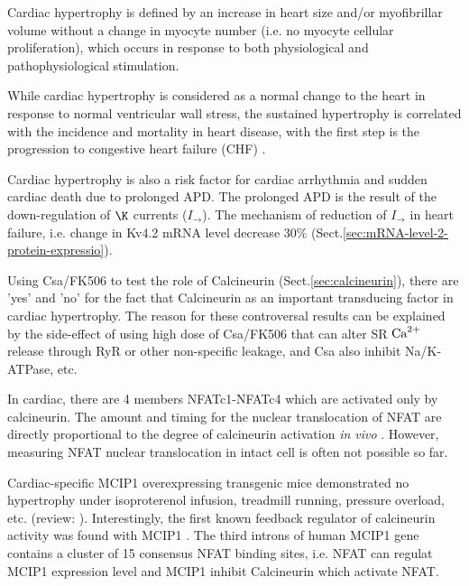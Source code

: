 \begin{framed}
Cardiac hypertrophy is defined by an increase in heart size and/or myofibrillar
volume without a change in myocyte number (i.e. no myocyte cellular
proliferation), which occurs in response to both physiological and
pathophysiological stimulation. 

While cardiac hypertrophy is considered as a normal change to the heart in
response to normal ventricular wall stress, the sustained hypertrophy is
correlated with the incidence and mortality in heart disease, with the first
step is the progression to congestive heart failure (CHF) \citep{levy1990}. 

Cardiac hypertrophy is also a risk factor for cardiac arrhythmia and sudden
cardiac death due to prolonged APD. The prolonged APD is the result of the
down-regulation of $\K$ currents ($I_\to$). The mechanism of reduction of
$I_\to$ in heart failure, i.e. change in Kv4.2 mRNA level decrease 30\%
\citep{kaab1998} (Sect.\ref{sec:mRNA-level-2-protein-expressio}).

\end{framed}

Using Csa/FK506 to test the role of Calcineurin (Sect.\ref{sec:calcineurin}),
there are 'yes' and 'no' for the fact that Calcineurin as an important
transducing factor in cardiac hypertrophy. The reason for these controversal
results can be explained by the side-effect of using high dose of Csa/FK506 that
can alter SR ${\text{Ca}^{2+}}$ release through RyR or other non-specific leakage, and Csa
also inhibit Na/K-ATPase, etc.

In cardiac, there are 4 members NFATc1-NFATc4 which are activated only by
calcineurin. The amount and timing for the nuclear translocation of NFAT are
directly proportional to the degree of calcineurin activation {\it in vivo}
\citep{hogan2003}. However, measuring NFAT nuclear translocation in intact cell
is often not possible so far.


Cardiac-specific MCIP1 overexpressing transgenic mice demonstrated no
hypertrophy under isoproterenol infusion, treadmill running, pressure overload,
etc. (review: \citep{wilkins2002cac}). Interestingly, the first known feedback
regulator of calcineurin activity was found with MCIP1 \citep{yang2000}. The
third introns of human MCIP1 gene contains a cluster of 15 consensus NFAT
binding sites, i.e. NFAT can regulat MCIP1 expression level and MCIP1 inhibit
Calcineurin which activate NFAT.
